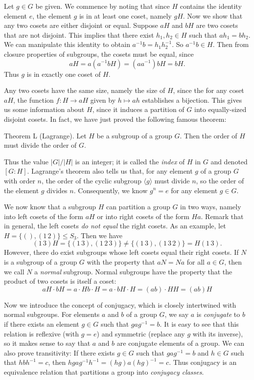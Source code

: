 \proof Let $g\in G$ be given. We commence by noting that since $H$ contains the identity element $e$, the element $g$ is in at least one coset, namely $gH$. Now we show that any two cosets are either disjoint or equal. Suppose $aH$ and $bH$ are two cosets that are not disjoint. This implies that there exist $h_1, h_2\in H$ such that $ah_1 = bh_2$. We can manipulate this identity to obtain $a^{-1}b = h_1h_2^{-1}$. So $a^{-1}b\in H$. Then from closure properties of subgroups, the cosets must be equal, since
$$aH = a(a^{-1}bH) = (aa^{-1})bH = bH.$$
Thus $g$ is in exactly one coset of $H$.\slug

Any two cosets have the same size, namely the size of $H$, since the for any coset $aH$, the function $f:H\rightarrow aH$ given by $h\mapsto ah$ establishes a bijection. This gives us some information about $H$, since it induces a partition of $G$ into equally-sized disjoint cosets. In fact, we have just proved the following famous theorem:

\parenproclaim Theorem L (Lagrange). Let $H$ be a subgroup of a group $G$. Then the order of $H$ must divide the order of $G$.\slug

Thus the value $|G|/|H|$ is an integer; it is called the {\it index} of $H$ in $G$ and denoted $[G:H]$. Lagrange's theorem also tells us that, for any element $g$ of a group $G$ with order $n$, the order of the cyclic subgroup $\langle g\rangle$ must divide $n$, so the order of the element $g$ divides $n$. Consequently, we know $g^n=e$ for any element $g\in G$.

We now know that a subgroup $H$ can partition a group $G$ in two ways, namely into left cosets of the form $aH$ or into right cosets of the form $Ha$. Remark that in general, the left cosets {\it do not equal} the right cosets. As an example, let $H = \{(), (1\,2)\} \leq S_3$. Then we have
$$(1\,3)H = \{(1\,3), (1\,2\,3)\} \neq \{(1\,3),(1\,3\,2)\} = H(1\,3).$$
However, there do exist subgroups whose left cosets equal their right cosets. If $N$ is a subgroup of a group $G$ with the property that $aN = Na$ for all $a\in G$, then we call $N$ a {\it normal} subgroup. Normal subgroups have the property that the product of two cosets is itself a coset:
$$aH\cdot bH = a\cdot Hb\cdot H = a \cdot bH \cdot H = (ab)\cdot HH = (ab)H$$

Now we introduce the concept of conjugacy, which is closely intertwined with normal subgroups. For elements $a$ and $b$ of a group $G$, we say $a$ is {\it conjugate} to $b$ if there exists an element $g\in G$ such that $gag^{-1} = b$. It is easy to see that this relation is reflexive (with $g=e$) and symmetric (replace any $g$ with its inverse), so it makes sense to say that $a$ and $b$ are conjugate elements of a group. We can also prove transitivity: If there exists $g\in G$ such that $gag^{-1} = b$ and $h\in G$ such that $hbh^{-1} = c$, then $hgag^{-1}h^{-1}= (hg)a(hg)^{-1} = c$. Thus conjugacy is an equivalence relation that partitions a group into {\it conjugacy classes}.

